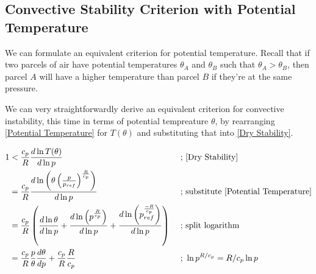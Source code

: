 \subsection{Convective Stability Criterion with Potential Temperature}

We can formulate an equivalent criterion for potential temperature. Recall that if two parcels of air have potential temperatures $\theta_A$ and $\theta_B$ such that $\theta_A>\theta_B$, then parcel $A$ will have a higher temperature than parcel $B$ if they're at the same pressure.

We can very straightforwardly derive an equivalent criterion for convective instability, this time in terms of potential tempreature $\theta$, by rearranging \ref{Potential Temperature} for $T(\theta)$ and substituting that into \ref{Dry Stability}.

\begin{align*}
    1&<\frac{c_p}{R}\frac{d\ln T(\theta)}{d\ln p}
    &\text{ ; }&\text{\ref{Dry Stability}}
    \\
    &=\frac{c_p}{R}\frac{d\ln \left( \theta\left( \frac{p}{p_{ref}} \right)^{\frac{R}{c_p}} \right)}{d\ln p}
    &\text{ ; }&\text{substitute \ref{Potential Temperature}}
    \\
    &=\frac{c_p}{R} \left( 
        \frac{d \ln \theta}{d \ln p}+
        \frac{d \ln \left(p^{\frac{R}{c_p}} \right)}{d \ln p}+
        \frac{d \ln \left(p_{ref}^{\frac{-R}{c_p}} \right)}{d \ln p}
     \right)
    &\text{ ; }&\text{split logarithm}
    \\
    &=\frac{c_p}{R}\frac{p}{\theta}\frac{d\theta}{dp}+\frac{c_p}{R}\frac{R}{c_p}
    &\text{ ; }
    &\ln p^{R/c_p}=R/c_p\ln p
\end{align*}
